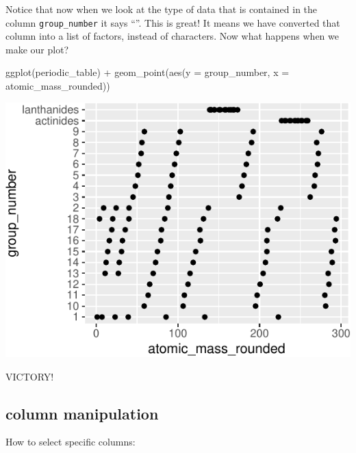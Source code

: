 \documentclass[
]{krantz}
\newenvironment{Shaded}{\begin{snugshade}}{\end{snugshade}}
\newcommand{\AttributeTok}[1]{\textcolor[rgb]{0.77,0.63,0.00}{#1}}
\newcommand{\FunctionTok}[1]{\textcolor[rgb]{0.00,0.00,0.00}{#1}}
\newcommand{\NormalTok}[1]{#1}
\newcommand{\SpecialCharTok}[1]{\textcolor[rgb]{0.00,0.00,0.00}{#1}}
\begin{document}
Notice that now when we look at the type of data that is contained in the column \texttt{group\_number} it says ``''. This is great! It means we have converted that column into a list of factors, instead of characters. Now what happens when we make our plot?

\begin{Shaded}
\begin{Highlighting}[]
\FunctionTok{ggplot}\NormalTok{(periodic\_table) }\SpecialCharTok{+}
  \FunctionTok{geom\_point}\NormalTok{(}\FunctionTok{aes}\NormalTok{(}\AttributeTok{y =}\NormalTok{ group\_number, }\AttributeTok{x =}\NormalTok{ atomic\_mass\_rounded))}
\end{Highlighting}
\end{Shaded}

\begin{center}\includegraphics{index_files/figure-latex/unnamed-chunk-189-1} \end{center}

VICTORY!

\hypertarget{column-manipulation}{%
\subsection{column manipulation}\label{column-manipulation}}

How to select specific columns:
\end{document}
